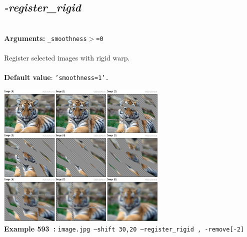 \documentclass[a4paper,11pt,twoside]{book}
\begin{document}
\subsection{\emph{-register\_rigid} }\vspace*{-0.5em}
~\\\textbf{Arguments: } 
{\small \texttt{\_smoothness$>$=0}}\\~\\
Register selected images with rigid warp.
~\\~\\\textbf{Default value}: {\small \texttt{'smoothness=1'.}}
\begin{center}\includegraphics[keepaspectratio=true,height=7cm,width=\textwidth]{img/gmic_def593.jpg}\\
{\footnotesize \textbf{Example 593~:} \texttt{image.jpg --shift 30,20 --register\_rigid , -remove[-2]}}
\end{center}
\end{document}

